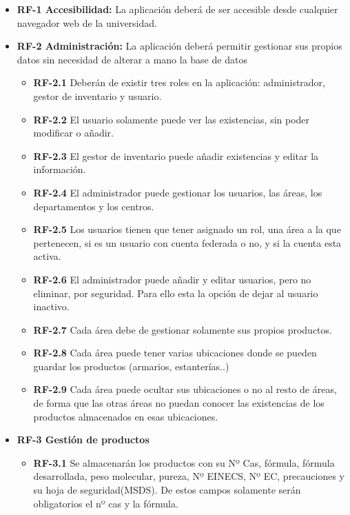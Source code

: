 \begin{itemize}
\item \textbf{RF-1 Accesibilidad:} La aplicación deberá de ser accesible desde cualquier navegador web de la universidad.

\item \textbf{RF-2 Administración:} La aplicación deberá permitir gestionar sus propios datos sin necesidad de alterar a mano la base de datos
	\begin{itemize}
	\item\textbf{ RF-2.1} Deberán de existir tres roles en la aplicación: administrador, gestor de inventario y usuario.
	
	\item \textbf{RF-2.2} El usuario solamente puede ver las existencias, sin poder modificar o añadir.
	
	\item \textbf{RF-2.3} El gestor de inventario puede añadir existencias y editar la información.
	
	\item \textbf{RF-2.4} El administrador puede gestionar los usuarios, las áreas, los departamentos y los centros.
	
	\item \textbf{RF-2.5} Los usuarios tienen que tener asignado un rol, una área a la que pertenecen, si es un usuario con cuenta federada o no, y si la cuenta esta activa.
	
	\item \textbf{RF-2.6} El administrador puede añadir y editar usuarios, pero no eliminar, por seguridad. Para ello esta la opción de dejar al usuario inactivo.
	
	\item \textbf{RF-2.7} Cada área debe de gestionar solamente sus propios productos.
	
	\item \textbf{RF-2.8} Cada área puede tener varias ubicaciones donde se pueden guardar los productos (armarios, estanterías..)
	
	\item \textbf{RF-2.9} Cada área puede ocultar sus ubicaciones o no al resto de áreas, de forma que las otras áreas no puedan conocer las existencias de los productos almacenados en esas ubicaciones.
	
	\end{itemize}
	
\item \textbf{RF-3 Gestión de productos}
	\begin{itemize}
	\item\textbf{ RF-3.1} Se almacenarán los productos con su Nº Cas, fórmula, fórmula desarrollada, peso molecular, pureza, Nº EINECS, Nº EC, precauciones y su hoja de seguridad(MSDS). De estos campos solamente serán obligatorios el nº cas y la fórmula.
	

\end{itemize}
\end{itemize}
